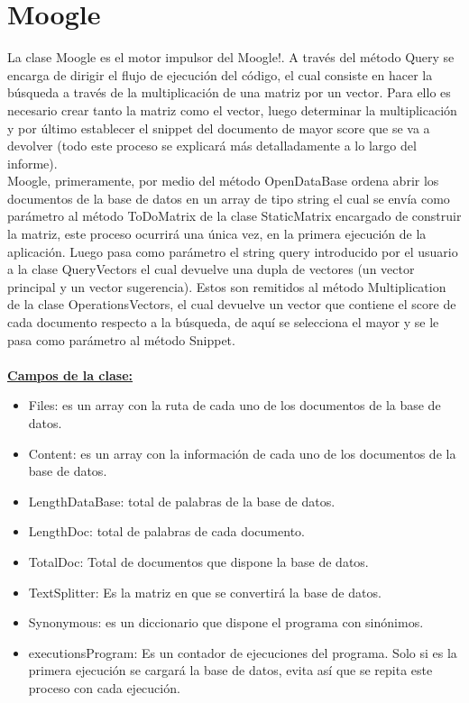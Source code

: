\documentclass[12pt, letterpaper]{article}
\begin{document}
\newpage

\section{Moogle}
La clase Moogle es el motor impulsor del Moogle!. A través del método Query se encarga de dirigir el flujo de ejecución del código, el cual consiste en  hacer la búsqueda a través de la multiplicación de una matriz por un vector. Para ello es necesario crear tanto la matriz como el vector, luego determinar la multiplicación y por último establecer el snippet del documento de mayor score que se va a devolver (todo este proceso se explicará más detalladamente a lo largo del informe). \\
Moogle, primeramente, por medio del método  OpenDataBase ordena abrir los documentos de la base de datos en un array de tipo string el cual se envía como parámetro al método ToDoMatrix de la clase StaticMatrix encargado de construir la matriz, este proceso ocurrirá una única vez, en la primera ejecución de la aplicación. Luego pasa como parámetro el string query introducido por el usuario a la clase QueryVectors el cual devuelve una dupla de vectores (un vector principal y un vector sugerencia). Estos son remitidos al método Multiplication de la clase OperationsVectors, el cual devuelve un vector que contiene el score de cada documento respecto a la búsqueda, de aquí se selecciona el mayor y se le pasa como parámetro al método Snippet. \\ \\

\textbf{\underline{Campos de la clase: }} 

\begin{itemize}

    \item Files: es un array con la ruta de cada uno de los documentos de la base de datos. 
    \item Content: es un array con la información de cada uno de los documentos de la base de datos. 
    \item LengthDataBase: total de palabras de la base de datos.
    \item LengthDoc: total de palabras de cada documento. 
    \item TotalDoc: Total de documentos que dispone la base de datos.
    \item TextSplitter: Es la matriz en que se convertirá la base de datos.
    \item Synonymous: es un diccionario que dispone el programa con sinónimos. 
    \item executionsProgram: Es un contador de ejecuciones del programa.  Solo si es  la primera ejecución se cargará la base de datos, evita      así que se repita este proceso con cada ejecución. 

    
\end{itemize}
\end{document}
